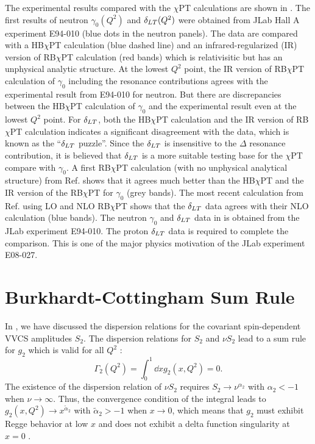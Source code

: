 The experimental results compared with the $\chi$PT calculations are shown in . The first results of neutron $\gamma_0(Q^2)$ and $\delta_{LT}(Q^2)$ were obtained from JLab Hall A experiment E94-010 \cite{Amarian2004b} (blue dots in the neutron panels). The data are compared with a HB$\chi$PT calculation \cite{Kao2003} (blue dashed line) and an infrared-regularized (IR) version of RB$\chi$PT calculation \cite{Bernard2003} (red bands) which is relativisitic but has an unphysical analytic structure. At the lowest $Q^2$ point, the IR version of RB$\chi$PT calculation of $\gamma_0$ including the resonance contributions agrees with the experimental result from E94-010 for neutron. But there are discrepancies between the HB$\chi$PT calculation of $\gamma_0$ and the experimental result even at the lowest $Q^2$ point. For $\delta_{LT}$, both the HB$\chi$PT calculation and the IR version of RB$\chi$PT calculation indicates a significant disagreement with the data, which is known as the ``$\delta_{LT}$ puzzle''. Since the $\delta_{LT}$ is insensitive to the $\Delta$ resonance contribution, it is believed that $\delta_{LT}$ is a more suitable testing base for the $\chi$PT compare with $\gamma_0$. A first RB$\chi$PT calculation (with no unphysical analytical structure) from Ref. \cite{Bernard2013} shows that it agrees much better than the HB$\chi$PT and the IR version of the RB$\chi$PT for $\gamma_0$ (grey bands). The most recent calculation from Ref. \cite{Lensky2014} using LO and NLO RB$\chi$PT shows that the $\delta_{LT}$ data agrees with their NLO calculation (blue bands). The neutron $\gamma_0$ and $\delta_{LT}$ data in  is obtained from the JLab experiment E94-010. The proton $\delta_{LT}$ data is required to complete the comparison. This is one of the major physics motivation of the JLab experiment E08-027.

\section{Burkhardt-Cottingham Sum Rule}
\label{C4S3}

In , we have discussed the dispersion relations for the covariant spin-dependent VVCS amplitudes $S_2$. The dispersion relations for $S_2$ and $\nu S_2$ lead to a sum rule for $g_2$ which is valid for all $Q^2$ \cite{Burkhardt1970}:
\begin{equation} \label{C4S3E1}
\Gamma_2(Q^2) = \int_0^1\dd{x}g_2(x,Q^2) = 0.
\end{equation}
The existence of the dispersion relation of $\nu S_2$ requires $S_2\rightarrow\nu^{\alpha_2}$ with $\alpha_2<-1$ when $\nu\rightarrow\infty$. Thus, the convergence condition of the integral leads to $g_2(x,Q^2)\rightarrow x^{\tilde{\alpha}_2}$ with $\tilde{\alpha}_2>-1$ when $x\rightarrow0$, which means that $g_2$ must exhibit Regge behavior at low $x$ and does not exhibit a delta function singularity at $x=0$ \cite{Jaffe1991}.

